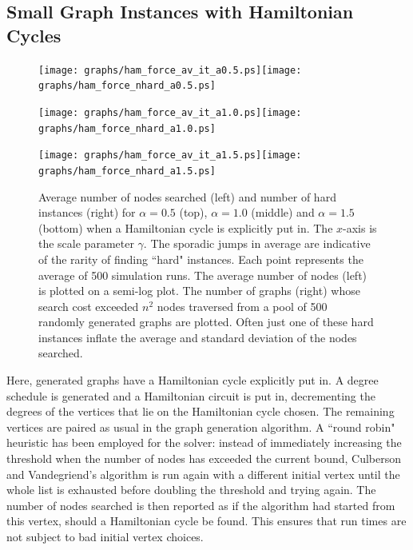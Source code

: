 \documentclass[twoside,11pt]{article}
\begin{document}
\subsection{Small Graph Instances with Hamiltonian Cycles}
\begin{figure}
\centering
\texttt{[image: graphs/ham\_force\_av\_it\_a0.5.ps]}\texttt{[image: graphs/ham\_force\_nhard\_a0.5.ps]}
\label{force.a0.5.nhard}
\label{force.a0.5.it}

\texttt{[image: graphs/ham\_force\_av\_it\_a1.0.ps]}\texttt{[image: graphs/ham\_force\_nhard\_a1.0.ps]}
\label{force.a1.0.nhard}


\label{force.a1.0.it}

\texttt{[image: graphs/ham\_force\_av\_it\_a1.5.ps]}\texttt{[image: graphs/ham\_force\_nhard\_a1.5.ps]}

\caption{
Average number of nodes searched (left) and number of hard instances (right)  for $\alpha = 0.5$ (top), $\alpha= 1.0$ (middle) and $\alpha = 1.5$ (bottom) 
when a Hamiltonian cycle is explicitly put in.
The $x$-axis is the scale parameter $\gamma$.  
The sporadic jumps in average are indicative of the rarity of finding
``hard" instances.  Each point represents the average of 500 simulation runs.
The average
number of nodes (left) is  plotted on a semi-log plot.
The number of graphs (right) whose
search cost exceeded $n^2$ nodes traversed from a pool of 500 randomly generated graphs are plotted.  Often just one of these
hard instances inflate the average and standard deviation of the nodes searched.
}
\label{force.a1.5.it}
\label{force.a1.5.nhard}
\end{figure}

Here, generated graphs have a Hamiltonian cycle explicitly put in.
A degree schedule is generated and a Hamiltonian circuit is put in, decrementing the degrees
of the vertices that lie on the Hamiltonian cycle chosen.  The remaining vertices are paired
as usual in the graph generation algorithm.
A ``round robin" heuristic has been employed for the solver:  instead
of immediately increasing the threshold when the number of nodes has exceeded the current bound,
Culberson and Vandegriend's algorithm
is run again with a different initial vertex until the whole list is
exhausted before doubling the threshold and trying again.  The number of nodes searched is
then reported as if the algorithm had started from this vertex, should a Hamiltonian cycle be found.
This ensures that run times are not subject to bad initial vertex choices.
\end{document}
